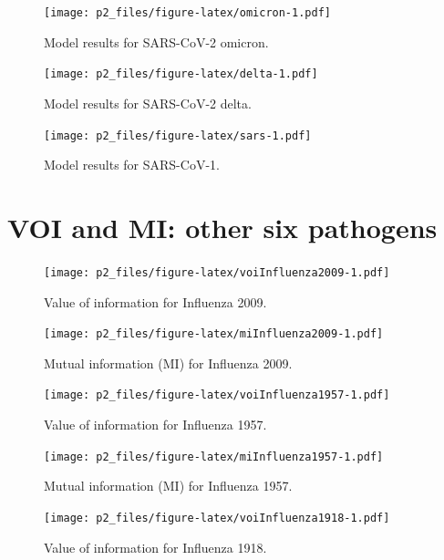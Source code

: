 \documentclass[
]{article}
\begin{document}
\begin{figure}
\centering
\texttt{[image: p2\_files/figure-latex/omicron-1.pdf]}
\caption{\label{fig:omicron}Model results for SARS-CoV-2 omicron.}
\end{figure}

\begin{figure}
\centering
\texttt{[image: p2\_files/figure-latex/delta-1.pdf]}
\caption{\label{fig:delta}Model results for SARS-CoV-2 delta.}
\end{figure}

\begin{figure}
\centering
\texttt{[image: p2\_files/figure-latex/sars-1.pdf]}
\caption{\label{fig:sars}Model results for SARS-CoV-1.}
\end{figure}

\newpage

\hypertarget{voi-and-mi-other-six-pathogens}{%
\section{VOI and MI: other six pathogens}\label{voi-and-mi-other-six-pathogens}}

\begin{figure}
\centering
\texttt{[image: p2\_files/figure-latex/voiInfluenza2009-1.pdf]}
\caption{\label{fig:voiInfluenza2009}Value of information for Influenza 2009.}
\end{figure}

\begin{figure}
\centering
\texttt{[image: p2\_files/figure-latex/miInfluenza2009-1.pdf]}
\caption{\label{fig:miInfluenza2009}Mutual information (MI) for Influenza 2009.}
\end{figure}

\begin{figure}
\centering
\texttt{[image: p2\_files/figure-latex/voiInfluenza1957-1.pdf]}
\caption{\label{fig:voiInfluenza1957}Value of information for Influenza 1957.}
\end{figure}

\begin{figure}
\centering
\texttt{[image: p2\_files/figure-latex/miInfluenza1957-1.pdf]}
\caption{\label{fig:miInfluenza1957}Mutual information (MI) for Influenza 1957.}
\end{figure}

\begin{figure}
\centering
\texttt{[image: p2\_files/figure-latex/voiInfluenza1918-1.pdf]}
\caption{\label{fig:voiInfluenza1918}Value of information for Influenza 1918.}
\end{figure}
\end{document}
